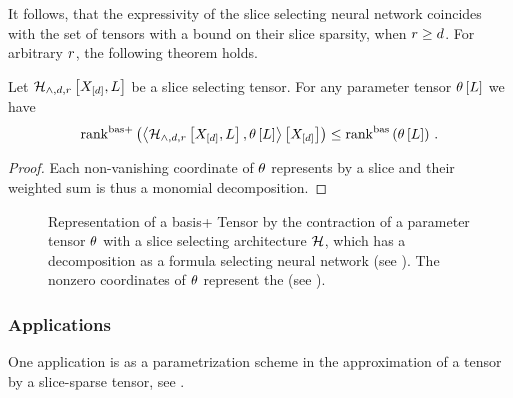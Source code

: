 It follows, that the expressivity of the slice selecting neural network coincides with the set of tensors with a bound on their slice sparsity, when $r\geq d$.
For arbitrary $r$, the following theorem holds.

\begin{theorem}
	Let $\mathcal{H}_{\land,d,r}\left[X_{[d]},L\right]$ be a slice selecting tensor.
	For any parameter tensor $\theta\left[L\right]$ we have
		\[ \mathrm{rank}^{\mathrm{bas+}}\left(\left\langle \mathcal{H}_{\land,d,r}\left[X_{[d]},L\right],\theta\left[L\right]\right\rangle \left[ X_{[d]} \right]\right) \leq \mathrm{rank}^{\mathrm{bas}}\left(\theta\left[L\right]\right) \, . \]
\end{theorem}
\begin{proof}
	Each non-vanishing coordinate of $\theta$ represents by  a slice and their weighted sum is thus a monomial decomposition.
\end{proof}


\begin{figure}[h]
	\begin{center}
		
	\end{center}
	\caption{Representation of a basis+ Tensor by the contraction of a parameter tensor $\theta$ with a slice selecting architecture $\mathcal{H}$, which has a decomposition as a formula selecting neural network (see ).
	The nonzero coordinates of $\theta$ represent the (see ).}
\end{figure}\label{fig:sliceSelectingNN}


\subsubsection{Applications}

One application is as a parametrization scheme in the approximation of a tensor by a slice-sparse tensor, see .



